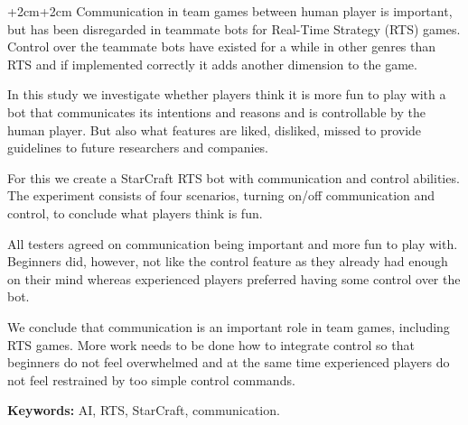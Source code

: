 \abstract
\begin{changemargin}{+2cm}{+2cm}
\noindent
Communication in team games between human player is important, but has been disregarded in teammate
bots for Real-Time Strategy (RTS) games. Control over the teammate bots have existed for a while in
other genres than RTS and if implemented correctly it adds another dimension to the game.

In this
study we investigate whether players think it is more fun to play with a bot that communicates its
intentions and reasons and is controllable by the human player. But also what features are liked,
disliked, missed to provide guidelines to future researchers and companies.

For this we create a StarCraft RTS bot with communication and control abilities. The experiment
consists of four scenarios, turning on/off communication and control, to conclude what players think
is fun.

All testers agreed on communication being important and more fun to play with. Beginners did,
however, not like the control feature as they already had enough on their mind whereas experienced players
preferred having some control over the bot. 

We conclude that communication is an important role in team games, including RTS games. More work
needs to be done how to integrate control so that beginners do not feel overwhelmed and at the same
time experienced players do not feel restrained by too simple control commands.

\par\vspace {1cm}
\noindent
\textbf{Keywords:} AI, RTS, StarCraft, communication.
\end{changemargin}
\clearpage
